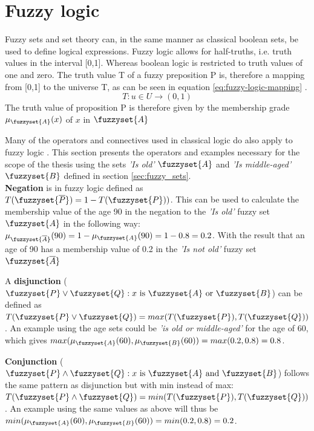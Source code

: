 \section{Fuzzy logic}
\label{section:fuzzy_logic}
Fuzzy sets and set theory can, in the same manner as classical boolean sets, be used to define logical expressions. Fuzzy logic allows for half-truths, i.e. truth values in the interval [0,1]. Whereas boolean logic is restricted to truth values of one and zero. The truth value T of a fuzzy preposition P is, therefore a mapping from [0,1] to the universe T, as can be seen in equation \ref{eq:fuzzy-logic-mapping} \cite{ross2009fuzzy}.
\begin{equation}
    T:u\in U\rightarrow (0,1)
    \label{eq:fuzzy-logic-mapping}
\end{equation}
The truth value of proposition P is therefore given by the membership grade $\mu_{\fuzzyset{A}}(x)$ of $x$ in $\fuzzyset{A}$

Many of the operators and connectives used in classical logic do also apply to fuzzy logic \cite{ross2009fuzzy}.
This section presents the operators and examples   necessary for the scope of the thesis using the sets \textit{'Is old'} $\fuzzyset{A}$ and \textit{'Is middle-aged'} $\fuzzyset{B}$  defined in section \ref{sec:fuzzy_sets}.\\

\textbf{Negation} is in fuzzy logic defined as $ T(\fuzzyset{\overline{P}})=1-T(\fuzzyset{P}))$. This can be used to calculate the membership value of the age 90 in the negation to the \textit{'Is old'}  fuzzy set $\fuzzyset{A}$ in the following way:
$\mu_{\fuzzyset{\overline{A}}}(90)=1-\mu_{\fuzzyset{A}}(90)=1-0.8=0.2$. With the result that an age of 90 has a membership value of 0.2 in the \textit{'Is not old'} fuzzy set $\fuzzyset{\overline{A}}$

A \textbf{disjunction} ($\fuzzyset{P}\lor \fuzzyset{Q}:x \text{ is } \fuzzyset{A} \text{ or } \fuzzyset{B}$)   can be defined as   $T(\fuzzyset{P} \lor \fuzzyset{Q}) = \\ max(T(\fuzzyset{P}),T(\fuzzyset{Q}))$. An example using the age sets could be \textit{'is old or middle-aged'} for the age of 60, which gives $max(\mu_{\fuzzyset{A}}(60),\mu_{\fuzzyset{B}}(60))=max(0.2,0.8)=0.8$.

\textbf{Conjunction} ($\fuzzyset{P}\land \fuzzyset{Q}:x \text{ is } \fuzzyset{A} \text{ and } \fuzzyset{B}$) follows the same pattern as disjunction but with min instead of max: $T(\fuzzyset{P} \land \fuzzyset{Q})=min(T(\fuzzyset{P}),T(\fuzzyset{Q}))$.
An example using the same values as above will thus be $min(\mu_{\fuzzyset{A}}(60),\mu_{\fuzzyset{B}}(60))=min(0.2,0.8)=0.2$.

